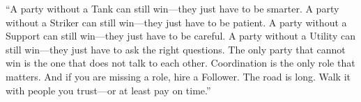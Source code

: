 \begin{tcolorbox}[colback=green!5!white,colframe=green!70!black,title=The Gray Wanderer's Advice,breakable]
``A party without a Tank can still win---they just have to be smarter. A party without a Striker can still win---they just have to be patient. A party without a Support can still win---they just have to be careful. A party without a Utility can still win---they just have to ask the right questions. The only party that cannot win is the one that does not talk to each other. Coordination is the only role that matters. And if you are missing a role, hire a Follower. The road is long. Walk it with people you trust---or at least pay on time.''
\end{tcolorbox}